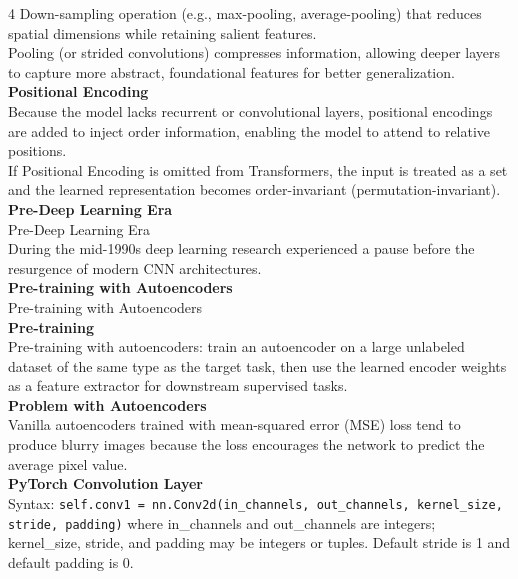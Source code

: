 \documentclass[8pt]{extarticle}
\begin{document}
\begin{multicols}{4}
{Down-sampling operation (e.g., max-pooling, average-pooling) that reduces spatial dimensions while retaining salient features.\\
Pooling (or strided convolutions) compresses information, allowing deeper layers to capture more abstract, foundational features for better generalization.\\
\vspace{2pt}\textbf{Positional Encoding}\\
Because the model lacks recurrent or convolutional layers, positional encodings are added to inject order information, enabling the model to attend to relative positions.\\
If Positional Encoding is omitted from Transformers, the input is treated as a set and the learned representation becomes order-invariant (permutation-invariant).\\
\vspace{2pt}\textbf{Pre-Deep Learning Era}\\
Pre-Deep Learning Era\\
During the mid-1990s deep learning research experienced a pause before the resurgence of modern CNN architectures.\\
\vspace{2pt}\textbf{Pre-training with Autoencoders}\\
Pre-training with Autoencoders\\
\vspace{2pt}\textbf{Pre‑training}\\
Pre-training with autoencoders: train an autoencoder on a large unlabeled dataset of the same type as the target task, then use the learned encoder weights as a feature extractor for downstream supervised tasks.\\
\vspace{2pt}\textbf{Problem with Autoencoders}\\
Vanilla autoencoders trained with mean-squared error (MSE) loss tend to produce blurry images because the loss encourages the network to predict the average pixel value.\\
\vspace{2pt}\textbf{PyTorch Convolution Layer}\\
Syntax: \texttt{self.conv1 = nn.Conv2d(in\_{}channels, out\_{}channels, kernel\_{}size, stride, padding)} where in\_{}channels and out\_{}channels are integers; kernel\_{}size, stride, and padding may be integers or tuples. Default stride is 1 and default padding is 0.\\
}
\end{multicols}
\end{document}
